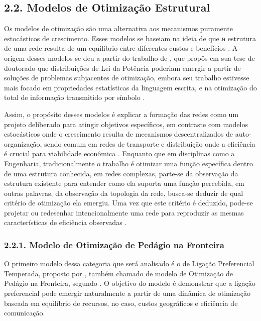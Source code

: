 \documentclass[12pt,oneside,a4paper,brazil,sumario=tradicional]{abntex2}
\begin{document}
\subsection*{2.2. Modelos de Otimização Estrutural}
Os modelos de otimização são uma alternativa aos mecanismos puramente estocásticos de crescimento.  Esses modelos se baseiam na ideia de que\textbf{ a }estrutura de uma rede resulta de um equilíbrio entre diferentes custos e benefícios \parencite{latora2017}. A origem desses modelos se deu a partir do trabalho de \textcite{mandelbrot1953}, que propôs em sua tese de doutorado que distribuições de Lei da Potência poderiam emergir a partir de soluções de problemas subjacentes de otimização, embora seu trabalho estivesse mais focado em propriedades estatísticas da linguagem escrita, e na otimização do total de informação transmitido por símbolo \parencite{dsouza2007}.

Assim, o propósito desses modelos é explicar a formação das redes como um projeto deliberado para atingir objetivos específicos, em contraste com modelos estocásticos onde o crescimento resulta de mecanismos descentralizados de auto-organização, sendo comum em redes de transporte e distribuição onde a eficiência é crucial para viabilidade econômica \parencite{newman2010}. Enquanto que em disciplinas como a Engenharia, tradicionalmente o trabalho é otimizar uma função específica dentro de uma estrutura conhecida, em redes complexas, parte-se da observação da estrutura existente para entender como ela suporta uma função percebida, em outras palavras, da observação da topologia da rede, busca-se deduzir de qual critério de otimização ela emergiu. Uma vez que este critério é deduzido, pode-se projetar ou redesenhar intencionalmente uma rede para reproduzir as mesmas características de eficiência observadas \parencite{souza2012}.

\subsubsection*{2.2.1. Modelo de Otimização de Pedágio na Fronteira}
O primeiro modelo dessa categoria que será analisado é o de Ligação Preferencial Temperada, proposto por \textcite{dsouza2007}, também chamado de modelo de Otimização de Pedágio na Fronteira, segundo \textcite{latora2017}. O objetivo do modelo é demonstrar que a ligação preferencial pode emergir naturalmente a partir de uma dinâmica de otimização baseada em equilíbrio de recursos, no caso, custos geográficos e eficiência de comunicação.
\end{document}
